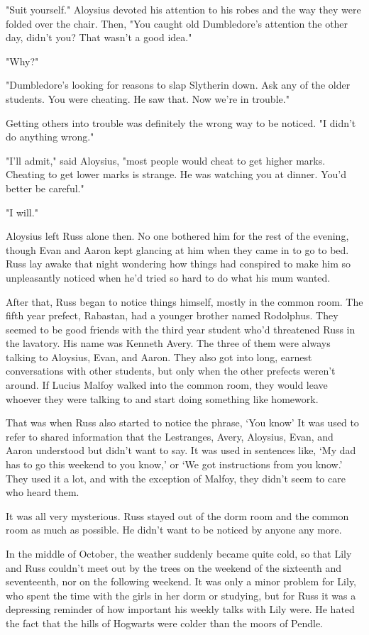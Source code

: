 "Suit yourself." Aloysius devoted his attention to his robes and the way they were folded over the chair. Then, "You caught old Dumbledore's attention the other day, didn't you? That wasn't a good idea."

"Why?"

"Dumbledore's looking for reasons to slap Slytherin down. Ask any of the older students. You were cheating. He saw that. Now we're in trouble."

Getting others into trouble was definitely the wrong way to be noticed. "I{\el} didn't do{\el} anything wrong."

"I'll admit," said Aloysius, "most people would cheat to get higher marks. Cheating to get lower marks is strange. He was watching you at dinner. You'd better be careful."

"I{\el} will."

Aloysius left Russ alone then. No one bothered him for the rest of the evening, though Evan and Aaron kept glancing at him when they came in to go to bed. Russ lay awake that night wondering how things had conspired to make him so unpleasantly noticed when he'd tried so hard to do what his mum wanted.

After that, Russ began to notice things himself, mostly in the common room. The fifth year prefect, Rabastan, had a younger brother named Rodolphus. They seemed to be good friends with the third year student who'd threatened Russ in the lavatory. His name was Kenneth Avery. The three of them were always talking to Aloysius, Evan, and Aaron. They also got into long, earnest conversations with other students, but only when the other prefects weren't around. If Lucius Malfoy walked into the common room, they would leave whoever they were talking to and start doing something like homework.

That was when Russ also started to notice the phrase, `You know{\el}' It was used to refer to shared information that the Lestranges, Avery, Aloysius, Evan, and Aaron understood but didn't want to say. It was used in sentences like, `My dad has to go this weekend to{\el} you know,' or `We got instructions from{\el} you know.' They used it a lot, and with the exception of Malfoy, they didn't seem to care who heard them.

It was all very mysterious. Russ stayed out of the dorm room and the common room as much as possible. He didn't want to be noticed by anyone any more.

In the middle of October, the weather suddenly became quite cold, so that Lily and Russ couldn't meet out by the trees on the weekend of the sixteenth and seventeenth, nor on the following weekend. It was only a minor problem for Lily, who spent the time with the girls in her dorm or studying, but for Russ it was a depressing reminder of how important his weekly talks with Lily were. He hated the fact that the hills of Hogwarts were colder than the moors of Pendle.

